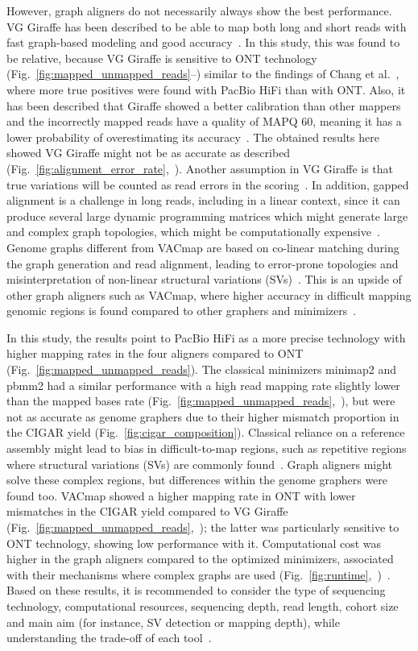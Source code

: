 \documentclass[12pt, letterpaper]{article}
\begin{document}
However, graph aligners do not necessarily always show the best performance. VG Giraffe has been described to be able to map both long and short reads with fast graph-based modeling and good accuracy~\cite{Chang2025}. In this study, this was found to be relative, because VG Giraffe is sensitive to ONT technology (Fig.~\ref{fig:mapped_unmapped_reads}--) similar to the findings of Chang et al.~\cite{Chang2025}, where more true positives were found with PacBio HiFi than with ONT. Also, it has been described that Giraffe showed a better calibration than other mappers and the incorrectly mapped reads have a quality of MAPQ 60, meaning it has a lower probability of overestimating its accuracy~\cite{Chang2025}. The obtained results here showed VG Giraffe might not be as accurate as described (Fig.~\ref{fig:alignment_error_rate},~). Another assumption in VG Giraffe is that true variations will be counted as read errors in the scoring~\cite{Liu2024}. In addition, gapped alignment is a challenge in long reads, including in a linear context, since it can produce several large dynamic programming matrices which might generate large and complex graph topologies, which might be computationally expensive~\cite{Liu2024}. Genome graphs different from VACmap are based on co-linear matching during the graph generation and read alignment, leading to error-prone topologies and misinterpretation of non-linear structural variations (SVs)~\cite{vacmap2025}. This is an upside of other graph aligners such as VACmap, where higher accuracy in difficult mapping genomic regions is found compared to other graphers and minimizers~\cite{Mahmoud2025}.

In this study, the results point to PacBio HiFi as a more precise technology with higher mapping rates in the four aligners compared to ONT (Fig.~\ref{fig:mapped_unmapped_reads}). The classical minimizers minimap2 and pbmm2 had a similar performance with a high read mapping rate slightly lower than the mapped bases rate (Fig.~\ref{fig:mapped_unmapped_reads},~), but were not as accurate as genome graphers due to their higher mismatch proportion in the CIGAR yield (Fig.~\ref{fig:cigar_composition}).
Classical reliance on a reference assembly might lead to bias in difficult-to-map regions, such as repetitive regions where structural variations (SVs) are commonly found~\cite{Sirén2021}. Graph aligners might solve these complex regions, but differences within the genome graphers were found too. VACmap showed a higher mapping rate in ONT with lower mismatches in the CIGAR yield compared to VG Giraffe (Fig.~\ref{fig:mapped_unmapped_reads},~); the latter was particularly sensitive to ONT technology, showing low performance with it. Computational cost was higher in the graph aligners compared to the optimized minimizers, associated with their mechanisms where complex graphs are used (Fig.~\ref{fig:runtime},~)~\cite{Mahmoud2025}. Based on these results, it is recommended to consider the type of sequencing technology, computational resources, sequencing depth, read length, cohort size and main aim (for instance, SV detection or mapping depth), while understanding the trade-off of each tool~\cite{Rausch2025}.
\end{document}
